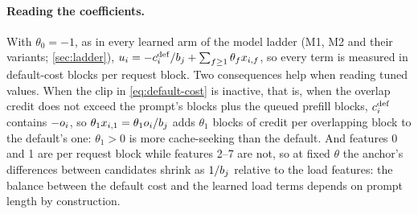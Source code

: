 \paragraph{Reading the coefficients.}
With $\theta_0 = -1$, as in every learned arm of the model ladder (M1, M2 and their variants;
\cref{sec:ladder}),
$u_i = -c^{\mathrm{def}}_i/b_j + \sum_{f \ge 1}\theta_f x_{i,f}$, so every term is measured
in default-cost blocks per request block. Two consequences help when reading tuned values. When
the clip in \cref{eq:default-cost} is inactive, that is, when the overlap credit does not exceed
the prompt's blocks plus the queued prefill blocks, $c^{\mathrm{def}}_i$ contains $-o_i$, so
$\theta_1 x_{i,1} = \theta_1o_i/b_j$ adds $\theta_1$ blocks of credit per
overlapping block to the default's one: $\theta_1 > 0$ is
more cache-seeking than the default. And features 0 and 1 are per request block while features
2--7 are not, so at fixed $\theta$ the anchor's differences between candidates shrink as
$1/b_j$ relative to the load features: the balance between the default cost and the
learned load terms depends on prompt length by construction.


